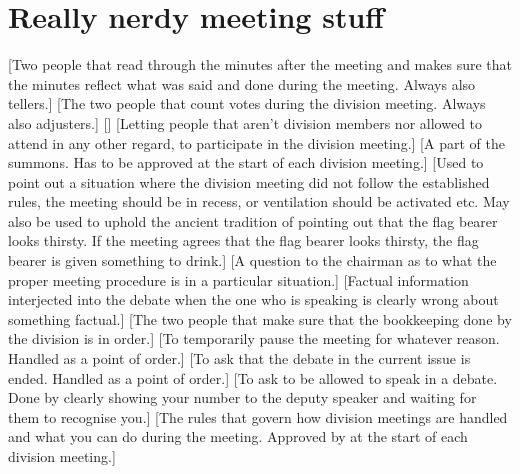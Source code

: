 \documentclass[a4paper]{article}
\begin{document}
\section{Really nerdy meeting stuff}
\begin{description}
    [Two people that read through the minutes after the meeting and makes sure that the minutes reflect what was said and done during the meeting. Always also tellers.]
    [The two people that count votes during the division meeting. Always also adjusters.]
    []
    [Letting people that aren't division members nor allowed to attend in any other regard, to participate in the division meeting.]
    [A part of the summons. Has to be approved at the start of each division meeting.]
    [Used to point out a situation where the division meeting did not follow the established rules, the meeting should be in recess, or ventilation should be activated etc. May also be used to uphold the ancient tradition of pointing out that the flag bearer looks thirsty. If the meeting agrees that the flag bearer looks thirsty, the flag bearer is given something to drink.]
    [A question to the chairman as to what the proper meeting procedure is in a particular situation.]
    [Factual information interjected into the debate when the one who is speaking is clearly wrong about something factual.]
    [The two people that make sure that the bookkeeping done by the division is in order.]
    [To temporarily pause the meeting for whatever reason. Handled as a point of order.]
    [To ask that the debate in the current issue is ended. Handled as a point of order.]
    [To ask to be allowed to speak in a debate. Done by clearly showing your number to the deputy speaker and waiting for them to recognise you.]
    [The rules that govern how division meetings are handled and what you can do during the meeting. Approved by at the start of each division meeting.]
\end{description}
\end{document}

